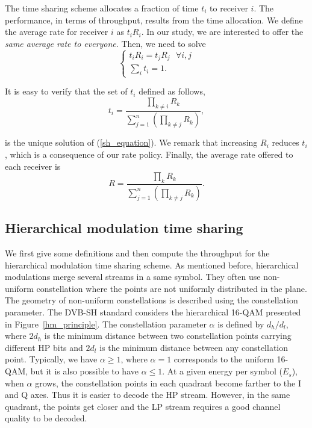 \documentclass[conference, letterpaper]{IEEEtran}
\begin{document}
The time sharing scheme allocates a fraction of time $t_i$ to receiver $i$. The performance, in terms of throughput, results from the time allocation. We define the average rate for receiver $i$ as $t_iR_i$. In our study, we are interested to offer the \emph{same average rate to everyone}. Then, we need to solve
\begin{equation}
\begin{cases}t_iR_i = t_jR_j \text{ } \forall i,j \\ \sum_{i} t_{i} = 1. \end{cases}
\label{sh_equation}
\end{equation} 

It is easy to verify that the set of $t_i$ defined as follows,
\begin{equation}
t_{i} = \frac{\prod_{k\neq i} R_k}{\sum_{j=1}^n \left(\prod_{k\neq j} R_k \right)},
\label{fraction_time}
\end{equation}

\noindent is the unique solution of (\ref{sh_equation}). We remark that increasing $R_i$ reduces $t_i$, which is a consequence of our rate policy. Finally, the average rate offered to each receiver is
\begin{equation}
R = \frac{\prod_{k} R_k}{\sum_{j=1}^n \left(\prod_{k\neq j} R_k \right)}.
\label{rate}
\end{equation}



\subsection{Hierarchical modulation time sharing}

We first give some definitions and then compute the throughput for the hierarchical modulation time sharing scheme. As mentioned before, hierarchical modulations merge several streams in a same symbol. They often use non-uniform constellation where the points are not  uniformly distributed in the plane. The geometry of non-uniform constellations is described using the constellation parameter. The DVB-SH standard considers the hierarchical 16-QAM presented in Figure~\ref{hm_principle}. The constellation parameter $\alpha$ is defined by $d_h/d_l$, where $2d_h$ is the minimum distance between two constellation points carrying different HP bits and $2d_l$ is the minimum distance between any constellation point. Typically, we have $\alpha \ge 1$, where $\alpha=1$ corresponds to the uniform 16-QAM, but it is also possible to have $\alpha \le 1$. At a given energy per symbol ($E_s$), when $\alpha$ grows, the constellation points in each quadrant become farther to the I and Q axes. Thus it is easier to decode the HP stream. However, in the same quadrant, the points get closer and the LP stream requires a good channel quality to be decoded.
\end{document}

